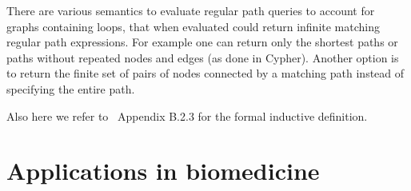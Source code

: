 There are various semantics to evaluate regular path queries to account for graphs containing loops, that when evaluated could return infinite matching regular path expressions. For example one can return only the shortest paths or paths without repeated nodes and edges (as done in Cypher). Another option is to return the finite set of pairs of nodes connected by a matching path instead of specifying the entire path.

Also here we refer to~\cite{Angles2017FoundationmodernQueryLnguagesforGraphDatabases} Appendix B.2.3 for the formal inductive definition.

\section{Applications in biomedicine}\label{kgs:biomed}

